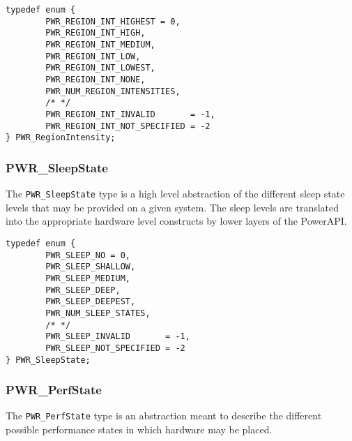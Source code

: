 \begin{center}
\begin{minipage}{.95\linewidth}%
\begin{lstlisting}
typedef enum {
        PWR_REGION_INT_HIGHEST = 0,
        PWR_REGION_INT_HIGH,
        PWR_REGION_INT_MEDIUM,
        PWR_REGION_INT_LOW,
        PWR_REGION_INT_LOWEST,
        PWR_REGION_INT_NONE,
        PWR_NUM_REGION_INTENSITIES,
        /* */
        PWR_REGION_INT_INVALID       = -1,
        PWR_REGION_INT_NOT_SPECIFIED = -2
} PWR_RegionIntensity;
\end{lstlisting}
\end{minipage}
\end{center}


\subsubsection{PWR_SleepState}\label{type:SleepState}

The \texttt{PWR_SleepState} type is a high level abstraction of the different sleep
state levels that may be provided on a given system. The sleep levels are translated into
the appropriate hardware level constructs by lower layers of the PowerAPI. 

\begin{center}
\begin{minipage}{.95\linewidth}%
\begin{lstlisting}
typedef enum {
        PWR_SLEEP_NO = 0,
        PWR_SLEEP_SHALLOW,
        PWR_SLEEP_MEDIUM,
        PWR_SLEEP_DEEP,
        PWR_SLEEP_DEEPEST,
        PWR_NUM_SLEEP_STATES,
        /* */
        PWR_SLEEP_INVALID       = -1,
        PWR_SLEEP_NOT_SPECIFIED = -2
} PWR_SleepState; 
\end{lstlisting}
\end{minipage}
\end{center}


\subsubsection{PWR_PerfState}\label{type:PerfState}

The \texttt{PWR_PerfState} type is an abstraction meant to describe the different
possible performance states in which hardware may be placed.

